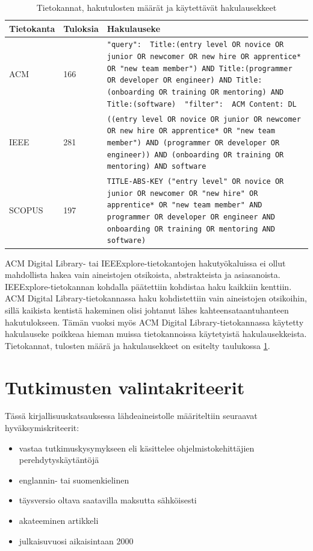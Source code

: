 \documentclass[utf8]{gradu3}
\begin{document}
\begin{table}[h]
    \footnotesize
    \begin{tabular}{llp{}}
        \toprule
        {Tietokanta} & Tuloksia & Hakulauseke \\
        \midrule
        ACM & 166 & {\tt "query": { Title:(entry level OR novice OR junior OR newcomer OR new hire OR apprentice* OR "new team member") AND Title:(programmer OR developer OR engineer) AND Title:(onboarding OR training OR mentoring) AND Title:(software) } "filter": { ACM Content: DL }  } \\
        \midrule
        IEEE & 281 & {\tt ((entry level OR novice OR junior OR newcomer OR new hire OR apprentice* OR "new team member") AND (programmer OR  developer OR engineer)) AND (onboarding OR training OR mentoring) AND software } \\
        \midrule
        SCOPUS & 197 & {\tt TITLE-ABS-KEY ("entry level"  OR  novice  OR  junior  OR  newcomer OR "new hire"  OR  apprentice* OR "new team member"  AND  programmer  OR  developer  OR  engineer  AND  onboarding  OR  training  OR  mentoring  AND  software)  } \\
        \bottomrule
    \end{tabular}  
    \caption{Tietokannat, hakutulosten määrät ja käytettävät hakulausekkeet}
    \label{tbl:tietokannat}
\end{table}

ACM Digital Library- tai IEEExplore-tietokantojen hakutyökaluissa ei ollut mahdollista hakea vain aineistojen otsikoista, abstrakteista ja asiasanoista. IEEExplore-tietokannan kohdalla päätettiin kohdistaa haku kaikkiin kenttiin. ACM Digital Library-tietokannassa haku kohdistettiin vain aineistojen otsikoihin, sillä kaikista kentistä hakeminen olisi johtanut lähes kahteensataantuhanteen hakutulokseen. Tämän vuoksi myös ACM Digital Library-tietokannassa käytetty hakulauseke poikkeaa hieman muissa tietokannoissa käytetyistä hakulausekkeista. Tietokannat, tulosten määrä ja hakulausekkeet on esitelty taulukossa \ref{tbl:tietokannat}.

\section{Tutkimusten valintakriteerit}

Tässä kirjallisuuskatsauksessa lähdeaineistolle määriteltiin seuraavat hyväksymiskriteerit:

\begin{itemize}
    \item vastaa tutkimuskysymykseen eli käsittelee ohjelmistokehittäjien perehdytyskäytäntöjä
    \item englannin- tai suomenkielinen
    \item täysversio oltava saatavilla maksutta sähköisesti
    \item akateeminen artikkeli
    \item julkaisuvuosi aikaisintaan 2000
\end{itemize}
\end{document}
